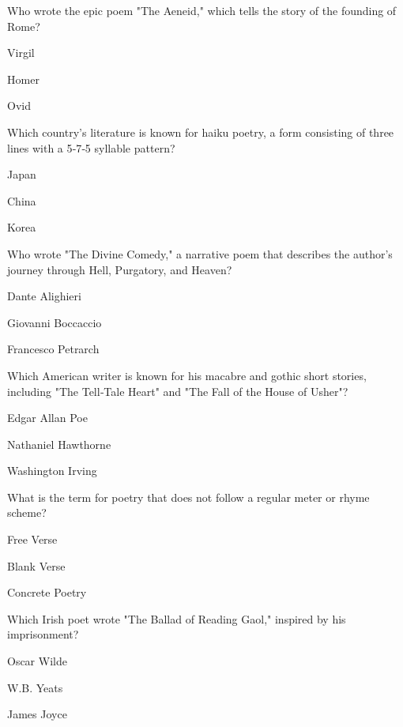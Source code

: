 
\begin{enhancedmcq}{Who wrote the epic poem "The Aeneid," which tells the story of the founding of Rome?}
\item Virgil
\item Homer
\item Ovid

\end{enhancedmcq}
\begin{enhancedmcq}{Which country's literature is known for haiku poetry, a form consisting of three lines with a 5‑7‑5 syllable pattern?}
\item Japan
\item China
\item Korea

\end{enhancedmcq}
\begin{enhancedmcq}{Who wrote "The Divine Comedy," a narrative poem that describes the author's journey through Hell, Purgatory, and Heaven?}
\item Dante Alighieri
\item Giovanni Boccaccio
\item Francesco Petrarch

\end{enhancedmcq}
\begin{enhancedmcq}{Which American writer is known for his macabre and gothic short stories, including "The Tell‑Tale Heart" and "The Fall of the House of Usher"?}
\item Edgar Allan Poe
\item Nathaniel Hawthorne
\item Washington Irving

\end{enhancedmcq}
\begin{enhancedmcq}{What is the term for poetry that does not follow a regular meter or rhyme scheme?}
\item Free Verse
\item Blank Verse
\item Concrete Poetry

\end{enhancedmcq}
\begin{enhancedmcq}{Which Irish poet wrote "The Ballad of Reading Gaol," inspired by his imprisonment?}
\item Oscar Wilde
\item W.B. Yeats
\item James Joyce

\end{enhancedmcq}
